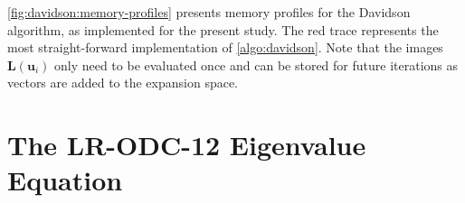 
\cref{fig:davidson:memory-profiles} presents memory profiles for the Davidson
algorithm, as implemented for the present study.
The red trace represents the most straight-forward implementation of
\cref{algo:davidson}.
Note that the images \(\mathbf{L}(\mathbf{u}_i)\) only need to be evaluated once
and can be stored for future iterations as vectors are added to the expansion
space.



\section{The LR-ODC-12 Eigenvalue Equation}
\label{sec:davidson:eig}

